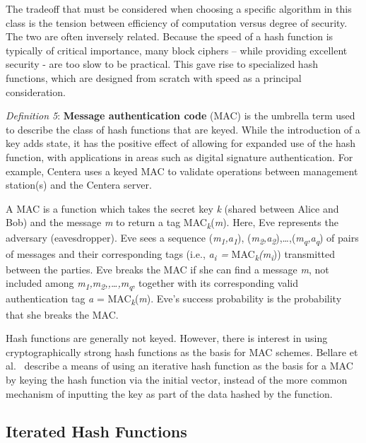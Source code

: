 The tradeoff that must be considered when choosing a specific algorithm
in this class is the tension between efficiency of computation versus
degree of security. The two are often inversely related. Because the
speed of a hash function is typically of critical importance, many block
ciphers -- while providing excellent security - are too slow to be
practical. This gave rise to specialized hash functions, which are
designed from scratch with speed as a principal consideration.

\emph{Definition 5}: \textbf{Message authentication code} (MAC) is the
umbrella term used to describe the class of hash functions that are
keyed. While the introduction of a key adds state, it has the positive
effect of allowing for expanded use of the hash function, with
applications in areas such as digital signature authentication. For
example, Centera uses a keyed MAC to validate operations between
management station(s) and the Centera server.

A MAC is a function which takes the secret key \emph{k} (shared between
Alice and Bob) and the message \emph{m} to return a tag
MAC\textsubscript{\emph{k}}(\emph{m}). Here, Eve represents the
adversary (eavesdropper). Eve sees a sequence
(\emph{m}\textsubscript{\emph{1}}\emph{,a}\textsubscript{\emph{1}}),
(\emph{m}\textsubscript{\emph{2}}\emph{,a}\textsubscript{\emph{2}}),\ldots,(\emph{m}\textsubscript{\emph{q}}\emph{,a}\textsubscript{\emph{q}})
of pairs of messages and their corresponding tags (i.e.,
\emph{a}\textsubscript{\emph{i~}}\emph{=}
MAC\textsubscript{\emph{k}}\emph{(m}\textsubscript{\emph{i}}))
transmitted between the parties. Eve breaks the MAC if she can find a
message \emph{m}, not included among
\emph{m}\textsubscript{\emph{1}}\emph{,m}\textsubscript{\emph{2}}\emph{,,\ldots,m}\textsubscript{\emph{q}},
together with its corresponding valid authentication tag \emph{a} =
MAC\textsubscript{\emph{k}}(\emph{m}). Eve's success probability is the
probability that she breaks the MAC.

Hash functions are generally not keyed. However, there is interest in
using cryptographically strong hash functions as the basis for MAC
schemes. Bellare et al.~\cite{ref16} describe a means of using
an iterative hash function as the basis for a MAC by keying the hash
function via the initial vector, instead of the more common mechanism of
inputting the key as part of the data hashed by the function.

\subsection{Iterated Hash Functions}\label{sec:2.2}\label{iterated-hash-functions}

